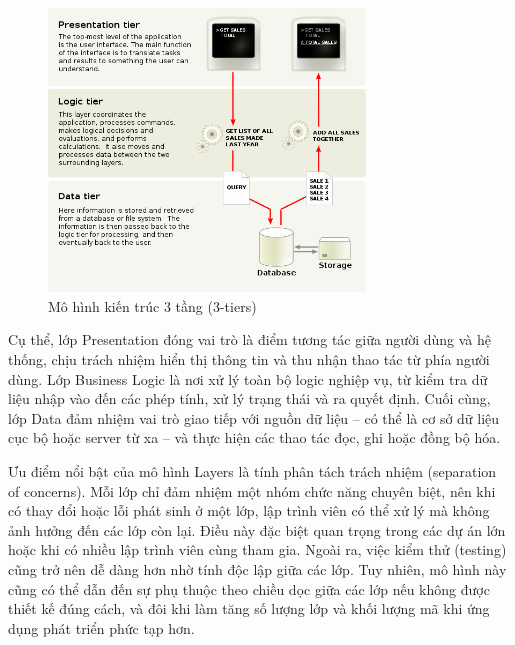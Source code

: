 \begin{figure}[h]
    \centering
    \includegraphics[width=0.75\textwidth]{images/layer.png}
    \caption{Mô hình kiến trúc 3 tầng (3-tiers)}
    \label{fig:fig11}
  \end{figure}
    
    \begin{flushleft}
        \hspace*{0.8cm}Cụ thể, lớp Presentation đóng vai trò là điểm tương tác giữa người dùng và hệ thống, chịu trách nhiệm hiển thị thông tin và thu nhận thao tác từ phía người dùng. Lớp Business Logic là nơi xử lý toàn bộ logic nghiệp vụ, từ kiểm tra dữ liệu nhập vào đến các phép tính, xử lý trạng thái và ra quyết định. Cuối cùng, lớp Data đảm nhiệm vai trò giao tiếp với nguồn dữ liệu – có thể là cơ sở dữ liệu cục bộ hoặc server từ xa – và thực hiện các thao tác đọc, ghi hoặc đồng bộ hóa.
    
    \end{flushleft}
    
    \begin{flushleft}
        \hspace*{0.8cm}Ưu điểm nổi bật của mô hình Layers là tính phân tách trách nhiệm (separation of concerns). Mỗi lớp chỉ đảm nhiệm một nhóm chức năng chuyên biệt, nên khi có thay đổi hoặc lỗi phát sinh ở một lớp, lập trình viên có thể xử lý mà không ảnh hưởng đến các lớp còn lại. Điều này đặc biệt quan trọng trong các dự án lớn hoặc khi có nhiều lập trình viên cùng tham gia. Ngoài ra, việc kiểm thử (testing) cũng trở nên dễ dàng hơn nhờ tính độc lập giữa các lớp. Tuy nhiên, mô hình này cũng có thể dẫn đến sự phụ thuộc theo chiều dọc giữa các lớp nếu không được thiết kế đúng cách, và đôi khi làm tăng số lượng lớp và khối lượng mã khi ứng dụng phát triển phức tạp hơn.
    \end{flushleft}
    
